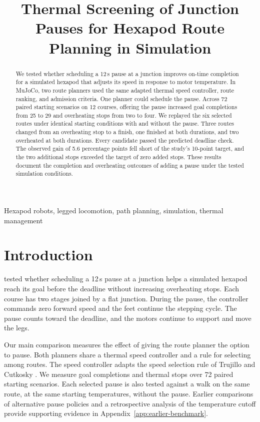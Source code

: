\documentclass{ieeeaccess}
\begin{document}

\title{Thermal Screening of Junction Pauses for Hexapod Route Planning in Simulation}
\begin{abstract}
We tested whether scheduling a 12\,s pause at a junction improves on-time completion for a simulated hexapod that adjusts its speed in response to motor temperature. In MuJoCo, two route planners used the same adapted thermal speed controller, route ranking, and admission criteria. One planner could schedule the pause. Across 72 paired starting scenarios on 12 courses, offering the pause increased goal completions from 25 to 29 and overheating stops from two to four. We replayed the six selected routes under identical starting conditions with and without the pause. Three routes changed from an overheating stop to a finish, one finished at both durations, and two overheated at both durations. Every candidate passed the predicted deadline check. The observed gain of 5.6 percentage points fell short of the study's 10-point target, and the two additional stops exceeded the target of zero added stops. These results document the completion and overheating outcomes of adding a pause under the tested simulation conditions.
\end{abstract}

\begin{keywords}
Hexapod robots, legged locomotion, path planning, simulation, thermal management
\end{keywords}
\titlepgskip=-21pt
\maketitle

\section{Introduction}

 tested whether scheduling a 12\,s pause at a junction helps a simulated hexapod reach its goal before the deadline without increasing overheating stops. Each course has two stages joined by a flat junction. During the pause, the controller commands zero forward speed and the feet continue the stepping cycle. The pause counts toward the deadline, and the motors continue to support and move the legs.

Our main comparison measures the effect of giving the route planner the option to pause. Both planners share a thermal speed controller and a rule for selecting among routes. The speed controller adapts the speed selection rule of Trujillo and Cutkosky \cite{trujillo2009}. We measure goal completions and thermal stops over 72 paired starting scenarios. Each selected pause is also tested against a walk on the same route, at the same starting temperatures, without the pause. Earlier comparisons of alternative pause policies and a retrospective analysis of the temperature cutoff provide supporting evidence in Appendix~\ref{app:earlier-benchmark}.
\end{document}
